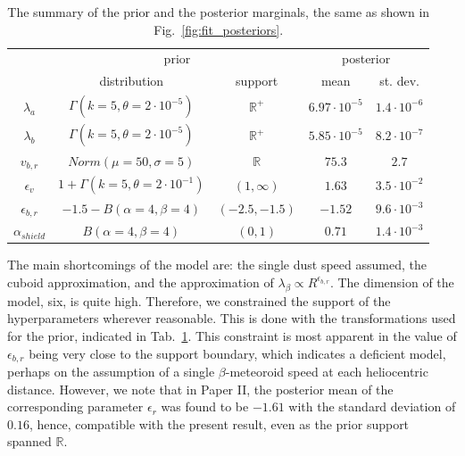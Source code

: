 \begin{table}[t]
\caption{The summary of the prior and the posterior marginals, the same as shown in Fig.~\ref{fig:fit_posteriors}.}
\centering
\label{tab:prior_posterior}
\begin{tabular}{c|cc|cc}
\multicolumn{1}{c}{  } \vline & \multicolumn{2}{c}{prior} \vline & \multicolumn{2}{c}{posterior} \\ 
& distribution & support & mean & st. dev. \\
\hline
$\lambda_a$ & $\Gamma(k=5,\theta=2\cdot10^{-5})$ & $\mathbb{R}^+$ &
$6.97 \cdot 10^{-5}$ & $1.4 \cdot 10^{-6}$  \\
$\lambda_b$ & $\Gamma(k=5,\theta=2\cdot10^{-5})$ & $\mathbb{R}^+$ & 
$5.85 \cdot 10^{-5}$ & $8.2 \cdot 10^{-7}$  \\
$v_{b,r}$ & $Norm(\mu=50,\sigma=5)$ & $\mathbb{R}$ & 
$75.3$ & $2.7$  \\
$\epsilon_v$ & $1+\Gamma(k=5,\theta=2\cdot10^{-1})$ & $(1,\infty)$ &
$1.63$ & $3.5 \cdot 10^{-2}$  \\
$\epsilon_{b,r}$ & $-1.5-B(\alpha=4,\beta=4)$ & $(-2.5,-1.5)$ &
$-1.52$ & $9.6 \cdot 10^{-3}$  \\
$\alpha_{shield}$ & $B(\alpha=4,\beta=4)$ & $(0,1)$ & 
$0.71$ & $1.4 \cdot 10^{-3}$  \\
\hline
\end{tabular}
\end{table}

The main shortcomings of the model are: the single dust speed assumed, the cuboid approximation, and the approximation of $\lambda_\beta \propto R^{\epsilon_{b,r}}$. The dimension of the model, six, is quite high. Therefore, we constrained the support of the hyperparameters wherever reasonable. This is done with the transformations used for the prior, indicated in Tab.~\ref{tab:prior_posterior}. This constraint is most apparent in the value of $\epsilon_{b,r}$ being very close to the support boundary, which indicates a deficient model, perhaps on the assumption of a single $\beta$-meteoroid speed at each heliocentric distance. However, we note that in Paper II, the posterior mean of the corresponding parameter $\epsilon_r$ was found to be $-1.61$ with the standard deviation of $0.16$, hence, compatible with the present result, even as the prior support spanned $\mathbb{R}$.


